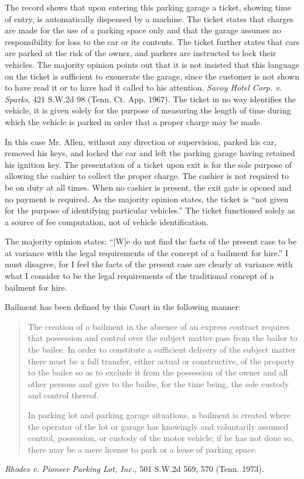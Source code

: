The record shows that upon entering this parking garage a ticket, showing time
of entry, is automatically dispensed by a machine. The ticket states that
charges are made for the use of a parking space only and that the garage
assumes no responsibility for loss to the car or its contents. The ticket
further states that cars are parked at the risk of the owner, and parkers are
instructed to lock their vehicles. The majority opinion points out that it is
not insisted that this language on the ticket is sufficient to exonerate the
garage, since the customer is not shown to have read it or to have had it
called to his attention. \textit{Savoy Hotel Corp. v. Sparks}, 421 S.W.2d 98
(Tenn. Ct. App. 1967). The ticket in no way identifies the vehicle, it is given
solely for the purpose of measuring the length of time during which the vehicle
is parked in order that a proper charge may be made.

In this case Mr. Allen, without any direction or supervision, parked his car,
removed his keys, and locked the car and left the parking garage having
retained his ignition key. The presentation of a ticket upon exit is for the
sole purpose of allowing the cashier to collect the proper charge. The cashier
is not required to be on duty at all times. When no cashier is present, the
exit gate is opened and no payment is required. As the majority opinion states, the ticket is ``not given
for the purpose of identifying particular vehicles.'' The ticket functioned
solely as a source of fee computation, not of vehicle identification.

The majority opinion states: ``[W]e do not find the facts of the present case to
be at variance with the legal requirements of the concept of a bailment for
hire.'' I must disagree, for I feel the facts of the present case are clearly
at variance with what I consider to be the legal requirements of the
traditional concept of a bailment for hire.

Bailment has been defined by this Court in the following manner:
\begin{quotation}
The creation of a bailment in the absence of an express contract requires that
possession and control over the subject matter pass from the bailor to the
bailee. In order to constitute a sufficient delivery of the subject matter
there must be a full transfer, either actual or constructive, of the property
to the bailee so as to exclude it from the possession of the owner and all
other persons and give to the bailee, for the time being, the sole custody and
control thereof.

In parking lot and parking garage situations, a bailment is created where the
operator of the lot or garage has knowingly and voluntarily assumed control,
possession, or custody of the motor vehicle; if he has not done so, there may
be a mere license to park or a lease of parking space.
\end{quotation}
\textit{Rhodes v. Pioneer Parking Lot, Inc.,} 501 S.W.2d 569, 570 (Tenn. 1973).

